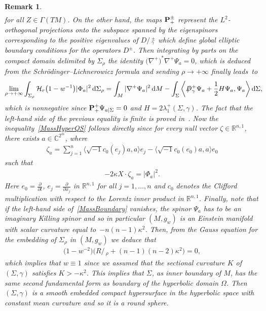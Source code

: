 \documentclass[pdftex]{sigma}
\numberwithin{equation}{section}
\newtheorem{Remark}[Theorem]{Remark}
\def\Paps{{\bf P}_+}
\def\Ss{R\!\!\!\!/\,}
\def\D{D\!\!\!\!/\,}
\begin{document}
\begin{Remark}
\begin{gather*}
\end{gather*}
for all $Z\in\Gamma(TM)$. On the other hand, the maps $\Paps^\pm$ represent the $L^2$-orthogonal projections onto the subspace spanned by the eigenspinors corresponding to the positive eigenvalues of $\D_\gamma^\pm$ which define global elliptic boundary conditions for the operators $D^\pm$. Then integrating by parts on the compact domain delimited by $\Sigma_\rho$ the identity
$
\big(\nabla^+\big)^*\nabla^+\Psi_a=0$,
which is deduced from the Schr\"odinger--Lichnerowicz formula and sending $\rho\rightarrow+\infty$ finally leads~to
\begin{gather}\label{MassBoundary}
\lim_{\rho\rightarrow+\infty}\int_{\Sigma_\rho}\mathcal{H}_r\big(1-w^{-1}\big)|\Phi_a|^2\,{\rm d}\Sigma_{\rho} =\int_M|\nabla^+\Psi_a|^2\,{\rm d}M-\int_\Sigma\bigg\langle \D^+_\gamma\Psi_a+\frac{1}{2}H\Psi_a,\Psi_a\bigg\rangle \,{\rm d}\Sigma,\!\!\!
\end{gather}
which is nonnegative since $\Paps^+\Psi_{a|\Sigma}=0$ and $H=2\lambda^+_1(\Sigma,\gamma)$. The fact that the left-hand side of the previous equality is finite is proved in~\cite{Kwong1, WangYau0}. Now the inequality~\eqref{MassHyperQS} follows directly since for every null vector $\zeta\in\mathbb{R}^{n,1}$, there exists $a\in\mathbb{C}^{2^m}$, where
\begin{gather*}
\zeta_a=\sum_{j=1}^n\big\langle \sqrt{-1}c_0(e_j)a,a\big\rangle e_j-\big\langle \sqrt{-1}c_0(e_0)a,a\big\rangle e_0
\end{gather*}
such that
\begin{gather*}
-2\kappa X\cdot\zeta_a=|\Phi_a|^2.
\end{gather*}
Here $e_0=\frac{\partial}{\partial t}$, $e_j=\frac{\partial}{\partial x_j}$ in $\mathbb{R}^{n,1}$ for all $j=1,\dots,n$ and $c_0$ denotes the Clifford multiplication with respect to the Lorentz inner product in $\mathbb{R}^{n,1}$. Finally, note that if the left-hand side of~\eqref{MassBoundary} vanishes, the spinor $\Psi_a$ has to be an imaginary Killing spinor and so in particular $(M,g_w)$ is an Einstein manifold with scalar curvature equal to~$-n(n-1)\kappa^2$. Then, from the Gauss equation for the embedding of $\Sigma_\rho$ in $(M,g_w)$ we deduce that
\begin{gather*}
\big(1-w^{-2}\big)\big(\Ss_\rho+(n-1)(n-2)\kappa^2\big)=0,
\end{gather*}
which implies that $w\equiv 1$ since we assumed that the sectional curvature $K$ of $(\Sigma,\gamma)$ satisfies $K>-\kappa^2$. This implies that $\Sigma$, as inner boundary of $M$, has the same second fundamental form as boundary of the hyperbolic domain $\Omega$. Then $(\Sigma,\gamma)$ is a smooth embedded compact hypersurface in the hyperbolic space with constant mean curvature and so it is a round sphere.
\end{Remark}
\end{document}
